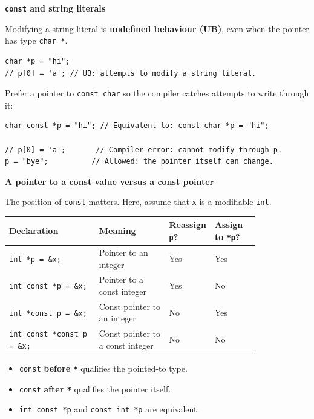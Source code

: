 \documentclass[11pt,a4paper]{article}
\begin{document}
\textbf{\texttt{const} and string literals}

Modifying a string literal is \textbf{undefined behaviour (UB)},
even when the pointer has type \texttt{char *}.

\begin{lstlisting}[style=cscode]
char *p = "hi";
// p[0] = 'a'; // UB: attempts to modify a string literal.
\end{lstlisting}

Prefer a pointer to \texttt{const char} so the compiler catches
attempts to write through it:

\begin{lstlisting}[style=cscode]
char const *p = "hi"; // Equivalent to: const char *p = "hi";

// p[0] = 'a';       // Compiler error: cannot modify through p.
p = "bye";          // Allowed: the pointer itself can change.
\end{lstlisting}

\textbf{A pointer to a const value versus a const pointer}

The position of \texttt{const} matters. Here, assume that
\texttt{x} is a modifiable \texttt{int}.

\begin{longtable}{@{}
    >{\raggedright\arraybackslash}p{0.36\linewidth}
    >{\raggedright\arraybackslash}p{0.28\linewidth}
    >{\raggedright\arraybackslash}p{0.18\linewidth}
    >{\raggedright\arraybackslash}p{}@{}}
\toprule
\textbf{Declaration} &
\textbf{Meaning} &
\textbf{Reassign \texttt{p}?} &
\textbf{Assign to \texttt{*p}?} \\
\midrule
\endhead
\bottomrule
\endlastfoot
\texttt{int *p = \&x;}
    & Pointer to an integer
    & Yes & Yes \\
\texttt{int const *p = \&x;}
    & Pointer to a const integer
    & Yes & No \\
\texttt{int *const p = \&x;}
    & Const pointer to an integer
    & No & Yes \\
\texttt{int const *const p = \&x;}
    & Const pointer to a const integer
    & No & No \\
\end{longtable}

\begin{itemize}
    \item \texttt{const} \textbf{before \texttt{*}} qualifies the
          pointed-to type.
    \item \texttt{const} \textbf{after \texttt{*}} qualifies the
          pointer itself.
    \item \texttt{int const *p} and \texttt{const int *p}
          are equivalent.
\end{itemize}
\end{document}
